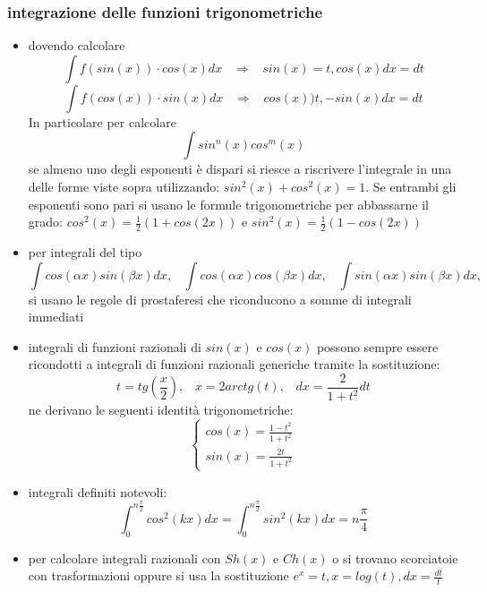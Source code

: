 \documentclass[a4paper, 9pt]{report}
\begin{document}
\subsubsection*{integrazione delle funzioni trigonometriche}
\begin{itemize}
    \item dovendo calcolare
    \[
        \int f(sin(x)) \cdot  cos(x) dx \;\;\; \Rightarrow  \;\;\; sin(x) = t, cos(x) dx =dt
    \]
    \[
        \int f(cos(x)) \cdot  sin(x) dx\;\;\; \Rightarrow  \;\;\; cos(x) ) t, -sin(x) dx = dt
    \]
    In particolare per calcolare 
    \[
        \int sin^n(x) cos^m(x)
    \]
    se almeno uno degli esponenti è dispari si riesce a riscrivere l'integrale in una delle forme viste sopra utilizzando: $sin^2(x) + cos^2(x) = 1$. Se entrambi gli esponenti sono pari si usano le formule trigonometriche per abbassarne il grado: $cos^2(x) = \frac{1}{2}(1+cos(2x))$ e $sin^2(x) = \frac{1}{2} (1-cos(2x))$
    \item per integrali del tipo
    \[
        \int cos(\alpha x) sin(\beta x) dx, \;\;\;\int cos(\alpha x) cos(\beta x) dx, \;\;\;\int sin(\alpha x) sin(\beta x) dx,
    \]
    si usano le regole di prostaferesi che riconducono a somme di integrali immediati
    \item integrali di funzioni razionali di $sin(x)$ e $cos(x)$ possono sempre essere ricondotti a integrali di funzioni razionali generiche tramite la sostituzione:
    \[
        t = tg\left(\frac{x}{2}\right), \;\;\; x= 2 arctg(t), \;\;\;dx = \frac{2}{1+t^2}dt
    \]
    ne derivano le seguenti identità trigonometriche:
    \[
        \begin{cases}
            cos(x) = \frac{1-t^2}{1+t^2}\\
            sin(x) = \frac{2t}{1+t^2}
        \end{cases}
    \]
    \item integrali definiti notevoli:
    \[
        \int_{0}^{n \frac{\pi}{2}}cos^2(kx) dx = \int_{0}^{n \frac{\pi}{2}}sin^2(kx) dx = n \frac{\pi}{4}
    \]
    \item per calcolare integrali razionali con $Sh(x)$ e $Ch(x)$ o si trovano scorciatoie con trasformazioni oppure si usa la sostituzione $e^x = t, x= log(t), dx = \frac{dt}{t}$
\end{itemize}
\end{document}

